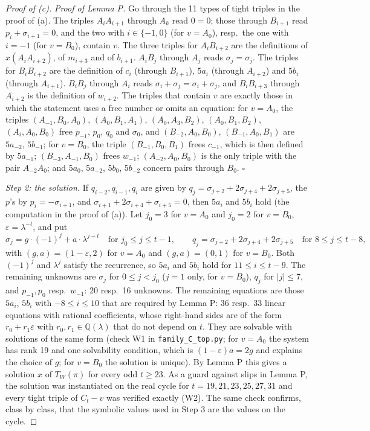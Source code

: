 \documentclass[11pt,a4paper]{article}
\theoremstyle{definition}
\theoremstyle{remark}
\newcommand{\Q}{\mathbb{Q}}
\newcommand{\eps}{\varepsilon}
\newcommand{\file}[1]{\texttt{#1}}
\newcommand{\step}[1]{\smallskip\noindent\emph{#1}}
\begin{document}
\begin{proof}[Proof of (c)]
\noindent\emph{Proof of Lemma P.} Go through the 11 types of tight triples in the proof of (a). The triples
$A_iA_{i+1}$ through $A_k$ read $0 = 0$; those through $B_{i+1}$ read $p_i + \sigma_{i+1} = 0$, and the two with
$i \in \{-1, 0\}$ (for $v = A_0$), resp.\ the one with $i = -1$ (for $v = B_0$), contain $v$. The three triples for
$A_iB_{i+2}$ are the definitions of $x(A_iA_{i+2})$, of $m_{i+3}$ and of $b_{i+1}$. $A_iB_j$ through $A_j$ reads
$\sigma_j = \sigma_j$. The triples for $B_iB_{i+2}$ are the definition of $c_i$ (through $B_{i+1}$), $5a_i$ (through
$A_{i+2}$) and $5b_i$ (through $A_{i+1}$). $B_iB_j$ through $A_i$ reads
$\sigma_i + \sigma_j = \sigma_i + \sigma_j$, and $B_iB_{i+3}$ through $A_{i+2}$ is the definition of $w_{i+2}$. The
triples that contain $v$ are exactly those in which the statement uses a free number or omits an equation: for
$v = A_0$, the triples $(A_{-1}, B_0, A_0)$, $(A_0, B_1, A_1)$, $(A_0, A_3, B_2)$, $(A_0, B_1, B_2)$,
$(A_i, A_0, B_0)$ free $p_{-1}$, $p_0$, $q_0$ and $\sigma_0$, and $(B_{-2}, A_0, B_0)$, $(B_{-1}, A_0, B_1)$ are
$5a_{-2}$, $5b_{-1}$; for $v = B_0$, the triple $(B_{-1}, B_0, B_1)$ frees $c_{-1}$, which is then defined by
$5a_{-1}$; $(B_{-3}, A_{-1}, B_0)$ frees $w_{-1}$; $(A_{-2}, A_0, B_0)$ is the only triple with the pair
$A_{-2}A_0$; and $5a_0$, $5a_{-2}$, $5b_0$, $5b_{-2}$ concern pairs through $B_0$. \hfill$\square$

\step{Step 2: the solution.} If $q_{i-2}, q_{i-1}, q_i$ are given by $q_j = \sigma_{j+2} + 2\sigma_{j+4} +
2\sigma_{j+5}$, the $p$'s by $p_i = -\sigma_{i+1}$, and $\sigma_{i+1} + 2\sigma_{i+4} + \sigma_{i+5} = 0$, then
$5a_i$ and $5b_i$ hold (the computation in the proof of (a)). Let $j_0 = 3$ for $v = A_0$ and $j_0 = 2$ for
$v = B_0$, $\eps = \lambda^{-t}$, and put
\[
  \sigma_j = g\cdot(-1)^j + a\cdot\lambda^{j-t} \quad\text{for } j_0 \le j \le t - 1, \qquad
  q_j = \sigma_{j+2} + 2\sigma_{j+4} + 2\sigma_{j+5} \quad\text{for } 8 \le j \le t - 8,
\]
with $(g, a) = (1 - \eps, 2)$ for $v = A_0$ and $(g, a) = (0, 1)$ for $v = B_0$. Both $(-1)^j$ and $\lambda^j$
satisfy the recurrence, so $5a_i$ and $5b_i$ hold for $11 \le i \le t - 9$. The remaining unknowns are $\sigma_j$ for
$0 \le j < j_0$ ($j = 1$ only, for $v = B_0$), $q_j$ for $|j| \le 7$, and $p_{-1}, p_0$ resp.\ $w_{-1}$: 20 resp.\
16 unknowns. The remaining equations are those $5a_i$, $5b_i$ with $-8 \le i \le 10$ that are required by Lemma P:
36 resp.\ 33 linear equations with rational coefficients, whose right-hand sides are of the form $r_0 + r_1\eps$
with $r_0, r_1 \in \Q(\lambda)$ that do not depend on $t$. They are solvable with solutions of the same form (check
W1 in \file{family\_C\_top.py}; for $v = A_0$ the system has rank 19 and one solvability condition, which is
$(1 - \eps)a = 2g$ and explains the choice of $g$; for $v = B_0$ the solution is unique). By Lemma P this gives a
solution $x$ of $T_W(\pi)$ for every odd $t \ge 23$. As a guard against slips in Lemma P, the solution was
instantiated on the real cycle for $t = 19, 21, 23, 25, 27, 31$ and every tight triple of $C_t - v$ was verified
exactly (W2). The same check confirms, class by class, that the symbolic values used in Step 3 are the values on the
cycle.


\end{proof}
\end{document}
